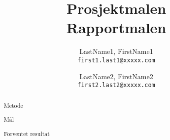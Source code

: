 \documentclass[11pt]{article} %
\title{Prosjektmalen \\ Rapportmalen}
\author{
			  LastName1, FirstName1\\
			  \texttt{first1.last1@xxxxx.com}
			  \and
			  LastName2, FirstName2\\
			  \texttt{first2.last2@xxxxx.com}}
\newcommand{\overskriften}[1]{\par\noindent\colorbox{headingcolor}
  {\parbox{\dimexpr\textwidth-2\fboxsep\relax}{#1}}}
\newcommand{\underoverskriften}[1]{\par\noindent\colorbox{subheadingcolor}
  {\parbox{\dimexpr\textwidth-10\fboxsep\relax}{#1}}}
\begin{document}

			\renewcommand\title{\underoverskriften}

			\renewcommand\section{\underoverskriften}

			\renewcommand\abstractname{\overskriften{\textsf{\Huge{Prosjektbeskrivelse}}}}
	        
	        \renewcommand\contentsname{\overskriften{\textsf{\Huge{Innhold}}}}
	        
	        \renewcommand\listfigurename{\overskriften{\textsf{\Huge{Illustrasjoner}}}}
	        
	        \renewcommand\tablename{\overskriften{\textsf{\Huge{Tabell}}}}
			
			\renewcommand\listtablename{Tabeller}
            
            \renewcommand\figurename{\overskriften{\textsf{\Huge{Illustrasjon}}}}


\begin{figure}[ht]
                      \begin{mdframed}[style=mystyleblue]
\maketitle

                    	\end{mdframed}
                    \end{figure}    






\begin{abstract}

	\section{Metode}
	
	\lipsum[1]

	\section{Mål}
	\lipsum[2]

	\section{Forventet resultat}
	\lipsum[3]

	

\end{abstract}
\end{document}

